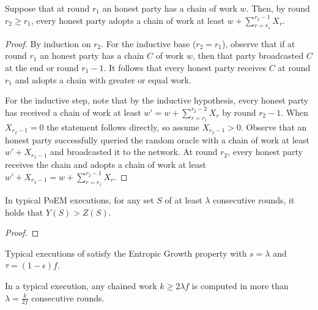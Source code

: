 \begin{lemma}
  Suppose that at round $r_1$ an honest party has a chain of work $w$.
  Then, by round $r_2 \geq r_1$, every honest party adopts a chain of work at least
  $w + \sum_{r = r_1}^{r_2 - 1}{X_r}$.
\end{lemma}
\begin{proof}
  By induction on $r_2$. For the inductive base ($r_2 = r_1$), observe that
  if at round $r_1$ an honest party has a chain $C$ of work $w$, then
  that party broadcasted $C$ at the end or round $r_1 - 1$. It follows that
  every honest party receives $C$ at round $r_1$ and adopts a chain with
  greater or equal work.

  For the inductive step, note that by the inductive hypothesis,
  every honest party has received a chain of work at least $w' = w + \sum_{r = r_1}^{r_2 - 2}{X_r}$
  by round $r_2 - 1$. When $X_{r_2 - 1} = 0$ the statement follows directly, so assume
  $X_{r_2 - 1} > 0$. Observe that an honest party successfully queried the random oracle
  with a chain of work at least $w' + X_{r_2 - 1}$ and broadcasted it to the network.
  At round $r_2$, every honest party receives the chain and adopts a chain
  of work at least $w' + X_{r_2 - 1} = w + \sum_{r = r_1}^{r_2 - 1}{X_r}$. \Qed
\end{proof}

\begin{conjecture} \label{lem:typical-bounds}
  In typical PoEM executions, for any set $S$ of at least $\lambda$ consecutive rounds,
  it holds that $Y(S) > Z(S)$.
\end{conjecture}
\begin{proof}
\end{proof}


\begin{theorem} 
  Typical executions of \poem satisfy the Entropic Growth property
  with $s = \lambda$ and $\tau = (1 - \epsilon)f$.
\end{theorem}

\begin{conjecture} \label{lem:patience}
  In a typical execution, any chained work $k \geq 2 \lambda f$ is computed
  in more than $\lambda = \frac{k}{2 f}$ consecutive rounds.
\end{conjecture}

